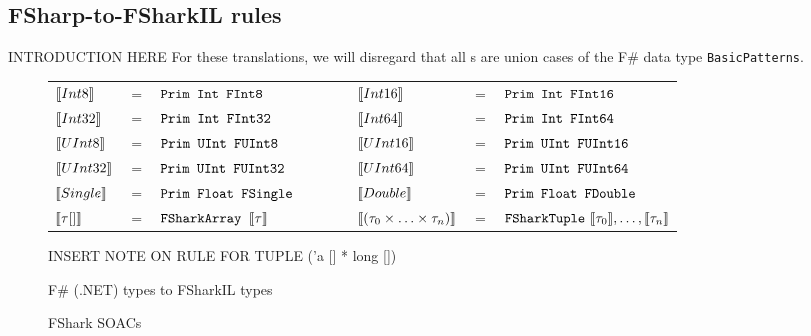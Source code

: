 \subsection{FSharp-to-FSharkIL rules}
INTRODUCTION HERE
For these translations, we will disregard that all \fsharpexpr{}s are union
cases of the F\# data type \texttt{BasicPatterns}.

\begin{figure}
  \centering
\begin{tabular}{@{}l c l c l c l}%
  $\llbracket Int8 \rrbracket$ & $=$ & $\text{\ttfamily Prim Int FInt8} $ & ~~~~~ & 
  $\llbracket Int16 \rrbracket$ & $=$ & $\text{\ttfamily Prim Int FInt16}$
  \\
  $\llbracket Int32 \rrbracket$ & $=$ & $\text{\ttfamily Prim Int FInt32} $ & ~~~~~ & 
  $\llbracket Int64 \rrbracket$ & $=$ & $\text{\ttfamily Prim Int FInt64} $
  \\
  $\llbracket UInt8 \rrbracket$ & $=$ & $\text{\ttfamily Prim UInt FUInt8} $ & ~~~~~ & 
  $\llbracket UInt16 \rrbracket$ & $=$ & $\text{\ttfamily Prim UInt FUInt16} $ 
  \\
  $\llbracket UInt32 \rrbracket$ & $=$ & $\text{\ttfamily Prim UInt FUInt32} $ & ~~~~~ & 
  $\llbracket UInt64 \rrbracket$ & $=$ & $\text{\ttfamily Prim UInt FUInt64} $ 
  \\
  $\llbracket Single \rrbracket$ & $=$ & $\text{\ttfamily Prim Float FSingle} $ & ~~~~~ & 
  $\llbracket Double \rrbracket$ & $=$ & $\text{\ttfamily Prim Float FDouble} $ 
  \\
  $\llbracket \tau [] \rrbracket$ & $=$ & $\text{\ttfamily FSharkArray }\llbracket \tau \rrbracket$ & ~~~~~ & 
  $\llbracket (\tau_0 \times \ldots \times \tau_n) \rrbracket$ & $=$ & $\text{\ttfamily FSharkTuple}~\llbracket \tau_0 \rrbracket,\ldots,\llbracket \tau_n \rrbracket$
  \\
\end{tabular}

INSERT NOTE ON RULE FOR TUPLE ('a [] * long [])

\caption{F\# (.NET) types to FSharkIL types}
\end{figure}


\begin{figure}
  \centering
\begin{tabular}{@{}l c l c l c l c l c l}%
  $\evals{Const(obj, \tau)}$ & $=$ & $\lit{Const}(obj,}\evals{\tau}}\lit{)}$ & ~~~~~ & 
  $\evals{i}$ & $=$ & $i$ & ~~~~~ & 
  $\evals{f}$ & $=$ & $f$ \\
  $\evals{c}$ & $=$ & $\id{ascii}(c)$ & ~~~~~ & 
  $\evals{\lit{tt}}$ & $=$ & \lit{true} & ~~~~~ & 
  $\evals{\lit{ff}}$ & $=$ & \lit{false} \\ ~ \\
\end{tabular}
  \caption{FShark SOACs}
\end{figure}





